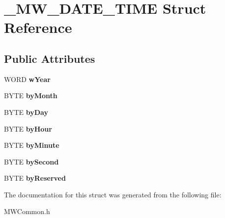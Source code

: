 \hypertarget{struct__MW__DATE__TIME}{\section{\-\_\-\-M\-W\-\_\-\-D\-A\-T\-E\-\_\-\-T\-I\-M\-E Struct Reference}
\label{struct__MW__DATE__TIME}
}
\subsection*{Public Attributes}
\begin{DoxyCompactItemize}
\item 
\hypertarget{struct__MW__DATE__TIME_a5164898b328396939bc72446a4c950b5}{W\-O\-R\-D {\bfseries w\-Year}}\label{struct__MW__DATE__TIME_a5164898b328396939bc72446a4c950b5}

\item 
\hypertarget{struct__MW__DATE__TIME_ab51e2001066423d3e22c627ef740c57f}{B\-Y\-T\-E {\bfseries by\-Month}}\label{struct__MW__DATE__TIME_ab51e2001066423d3e22c627ef740c57f}

\item 
\hypertarget{struct__MW__DATE__TIME_ae25edf5a0d47c44c168738ac47b980d0}{B\-Y\-T\-E {\bfseries by\-Day}}\label{struct__MW__DATE__TIME_ae25edf5a0d47c44c168738ac47b980d0}

\item 
\hypertarget{struct__MW__DATE__TIME_a42aae2235f968b837c3b363c9a1ce524}{B\-Y\-T\-E {\bfseries by\-Hour}}\label{struct__MW__DATE__TIME_a42aae2235f968b837c3b363c9a1ce524}

\item 
\hypertarget{struct__MW__DATE__TIME_aaea45e3d8ff05d4ad58806d1e6f9fbc3}{B\-Y\-T\-E {\bfseries by\-Minute}}\label{struct__MW__DATE__TIME_aaea45e3d8ff05d4ad58806d1e6f9fbc3}

\item 
\hypertarget{struct__MW__DATE__TIME_ad81ad80f83ea0c0f44f48ddd10cf4b25}{B\-Y\-T\-E {\bfseries by\-Second}}\label{struct__MW__DATE__TIME_ad81ad80f83ea0c0f44f48ddd10cf4b25}

\item 
\hypertarget{struct__MW__DATE__TIME_a5b83965d01990e3ab0b846b4262d3d09}{B\-Y\-T\-E {\bfseries by\-Reserved}}\label{struct__MW__DATE__TIME_a5b83965d01990e3ab0b846b4262d3d09}

\end{DoxyCompactItemize}


The documentation for this struct was generated from the following file\-:\begin{DoxyCompactItemize}
\item 
M\-W\-Common.\-h\end{DoxyCompactItemize}
